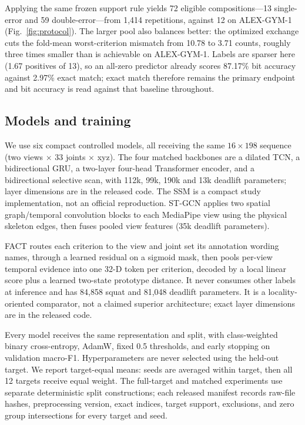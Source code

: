 \documentclass[conference,a4paper]{IEEEtran}
\begin{document}
Applying the same frozen support rule yields 72 eligible compositions---13
single-error and 59 double-error---from 1{,}414 repetitions, against 12 on
ALEX-GYM-1 (Fig.~\ref{fig:protocol}). The larger pool also balances better: the optimized exchange cuts
the fold-mean worst-criterion mismatch from 10.78 to 3.71 counts, roughly three
times smaller than is achievable on ALEX-GYM-1. Labels are sparser here (1.67
positives of 13), so an all-zero predictor already scores 87.17\% bit accuracy
against 2.97\% exact match; exact match therefore remains the primary endpoint
and bit accuracy is read against that baseline throughout.

\subsection{Models and training}
We use six compact controlled models, all receiving the same $16\times198$
sequence (two views $\times$ 33 joints $\times$ xyz). The four matched
backbones are a dilated TCN, a bidirectional
GRU, a two-layer four-head Transformer encoder, and a bidirectional selective
scan, with 112k, 99k, 190k and 13k deadlift parameters; layer dimensions are in
the released code. The SSM is a compact study implementation, not an official
reproduction. ST-GCN applies two spatial graph/temporal
convolution blocks to each MediaPipe view using the physical skeleton edges,
then fuses pooled view features (35k deadlift parameters).

FACT routes each criterion to the view and joint set its annotation wording
names, through a learned residual on a sigmoid mask, then pools per-view
temporal evidence into one 32-D token per criterion, decoded by a local linear
score plus a learned two-state prototype distance. It never consumes other
labels at inference and has 84,858 squat and 81,048 deadlift parameters. It is
a locality-oriented comparator, not a claimed superior architecture; exact
layer dimensions are in the released code.

Every model receives the same representation and split, with class-weighted
binary cross-entropy, AdamW, fixed 0.5 thresholds, and early stopping on
validation macro-F1. Hyperparameters are never selected using
the held-out target. We report target-equal means: seeds are averaged within
target, then all 12 targets receive equal weight. The full-target and matched
experiments use separate deterministic split constructions; each released
manifest records raw-file hashes, preprocessing version, exact indices, target
support, exclusions, and zero group intersections for every target and seed.
\end{document}
